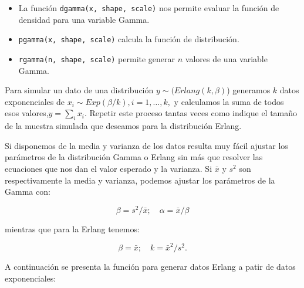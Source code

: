 \documentclass[
]{book}
\providecommand{\tightlist}{%
  \setlength{\itemsep}{0pt}\setlength{\parskip}{0pt}}
\newenvironment{whitebox}{
  \definecolor{shadecolor}{rgb}{255, 255, 255}  
  \color{black}
  \begin{shaded}}
 {\end{shaded}}
\theoremstyle{definition}
\theoremstyle{definition}
\theoremstyle{definition}
\theoremstyle{definition}
\theoremstyle{remark}
\begin{document}
\begin{whitebox}

\begin{itemize}
\tightlist
\item
  La función \texttt{dgamma(x,\ shape,\ scale)} nos permite evaluar la función de densidad para una variable Gamma.
\item
  \texttt{pgamma(x,\ shape,\ scale)} calcula la función de distribución.
\item
  \texttt{rgamma(n,\ shape,\ scale)} permite generar \(n\) valores de una variable Gamma.
\end{itemize}

Para simular un dato de una distribución \(y \sim (Erlang(k, \beta)\)) generamos \(k\) datos exponenciales de \(x_i \sim Exp(\beta/k), i=1,\ldots,k,\) y calculamos la suma de todos esos valores,\(y=\sum_i x_i\). Repetir este proceso tantas veces como indique el tamaño de la muestra simulada que deseamos para la distribución Erlang.

\end{whitebox}

Si disponemos de la media y varianza de los datos resulta muy fácil ajustar los parámetros de la distribución Gamma o Erlang sin más que resolver las ecuaciones que nos dan el valor esperado y la varianza. Si \(\bar{x}\) y \(s^2\) son respectivamente la media y varianza, podemos ajustar los parámetros de la Gamma con:

\[ \beta = s^2/\bar{x}; \quad \alpha = \bar{x}/\beta\]

mientras que para la Erlang tenemos:

\[ \beta = \bar{x}; \quad k = \bar{x}^2/s^2.\]

A continuación se presenta la función para generar datos Erlang a patir de datos exponenciales:
\end{document}
